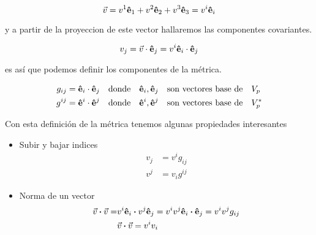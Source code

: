 \documentclass[../Main.tex]{subfiles}
\begin{document}
\begin{equation}
    \vec{v}=v^{1}\vu{e}_1+v^{2}\vu{e}_2+v^{3}\vu{e}_3 = v^{i}\vu{e}_i
\end{equation}

y a partir de la proyeccion de este vector hallaremos las componentes covariantes.

\begin{equation}
    v_{j}=\vec{v}\cdot\vu{e}_{j}=v^{i}\vu{e}_i\cdot\vu{e}_{j}
\end{equation}

es así que podemos definir los componentes de la métrica.

\begin{eqnarray}
    g_{ij} = \vu{e}_i\cdot\vu{e}_{j} & \qq{donde} \vu{e}_i,\vu{e}_j \qq{son vectores base de} V_{p}\\
    g^{ij} = \vu{e}^i\cdot\vu{e}^{j} & \qq{donde} \vu{e}^i,\vu{e}^j \qq{son vectores base de} V^{*}_{p}
\end{eqnarray}

Con esta definición de la métrica tenemos algunas propiedades interesantes

\begin{itemize}
    \item Subir y bajar indices
    \begin{eqnarray}
        v_{j} & = v^{i} g_{ij} \\
        v^{j} & = v_{i} g^{ij}
    \end{eqnarray}
    \item Norma de un vector
    \begin{eqnarray}
        \vec{v}\vdot\vec{v}= & v^{i}\vu{e}_i\vdot v^{j}\vu{e}_j=v^{i}v^{j}\vu{e}_i\vdot\vu{e}_{j}=v^{i}v^{j}g_{ij} \\ 
        & \vec{v}\vdot\vec{v} = v^{i} v_{i}
    \end{eqnarray}
\end{itemize}


\biblio %
\end{document}
